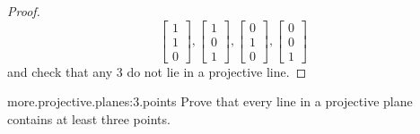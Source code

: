 \begin{proof}
\[\begin{bmatrix}
1 \\
1 \\
0
\end{bmatrix}, 
\begin{bmatrix}
1 \\
0 \\
1
\end{bmatrix}, 
\begin{bmatrix}
0 \\
1 \\
0
\end{bmatrix}, 
\begin{bmatrix}
0 \\
0 \\
1
\end{bmatrix}
\]
and check that any 3 do not lie in a projective line.
\end{proof}


\begin{problem}{more.projective.planes:3.points}
Prove that every line in a projective plane contains at least three points.
\end{problem}

